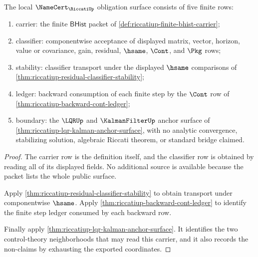 \begin{theorem}
\label{thm:riccatiup-namecert-obligation-surface}
The local $\NameCert_{\RiccatiUp}$ obligation surface consists of five finite rows:
\begin{enumerate}
\item carrier: the finite $\mathsf{BHist}$ packet of \autoref{def:riccatiup-finite-bhist-carrier};
\item classifier: componentwise acceptance of displayed matrix, vector, horizon, value or covariance, gain, residual, $\hsame$, $\Cont$, and $\Pkg$ rows;
\item stability: classifier transport under the displayed $\hsame$ comparisons of \autoref{thm:riccatiup-residual-classifier-stability};
\item ledger: backward consumption of each finite step by the $\Cont$ row of \autoref{thm:riccatiup-backward-cont-ledger};
\item boundary: the $\LQRUp$ and $\KalmanFilterUp$ anchor surface of \autoref{thm:riccatiup-lqr-kalman-anchor-surface}, with no analytic convergence, stabilizing solution, algebraic Riccati theorem, or standard bridge claimed.
\end{enumerate}
\end{theorem}
\begin{proof}
The carrier row is the definition itself, and the classifier row is obtained by reading all of its displayed fields. No additional source is available because the packet lists the whole public surface.

Apply \autoref{thm:riccatiup-residual-classifier-stability} to obtain transport under componentwise $\hsame$. Apply \autoref{thm:riccatiup-backward-cont-ledger} to identify the finite step ledger consumed by each backward row.

Finally apply \autoref{thm:riccatiup-lqr-kalman-anchor-surface}. It identifies the two control-theory neighborhoods that may read this carrier, and it also records the non-claims by exhausting the exported coordinates.
\end{proof}


